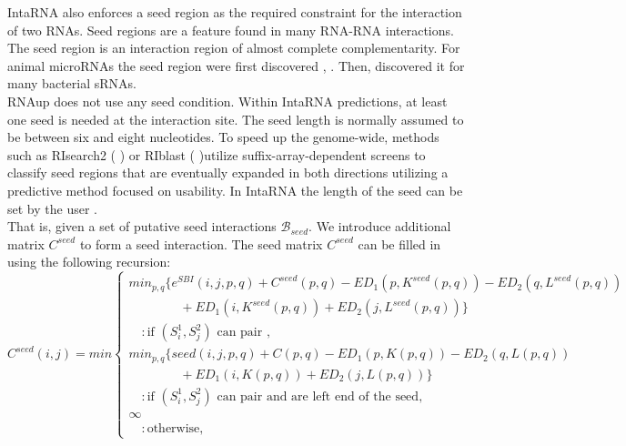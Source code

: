 \documentclass[twoside,a4paper]{report}
\numberwithin{equation}{section}
\begin{document}
	
	IntaRNA also enforces a seed region as the required constraint for the interaction of two RNAs. Seed regions are a feature found in many RNA-RNA interactions. The seed region is an interaction region of almost complete complementarity. For animal microRNAs the seed region were first discovered \citep{bentwich2005prediction}, \citep{brennecke2005principles}. Then, \citet{tjaden2006target} discovered it for many bacterial sRNAs. \\
	
	 RNAup does not use any seed condition. Within IntaRNA predictions, at least one seed is needed at the interaction site. The seed length is normally assumed to be between six and eight nucleotides. To speed up the genome-wide, methods such as RIsearch2 (\citep{alkan2017risearch2} ) or RIblast (\citep{fukunaga2017riblast} )utilize suffix-array-dependent screens to classify seed regions that are eventually expanded in both directions utilizing a predictive method focused on usability. In IntaRNA the length of the seed can be set by the user \citep{busch2008intarna}. \\
	
%	
%	
	
	That is, given a set of putative seed interactions $\mathcal{B}_{seed}$. We introduce additional matrix $C^{seed}$ to form a seed interaction. The seed matrix $C^{seed}$ can be filled in using the following recursion:\\
	
	
		\begin{equation}
	C^{seed}(i,j) =  min \begin{cases}
	min_{p,q}\{ e^{SBI}(i,j,p,q)+ C^{seed}(p,q) - ED_1(p,K^{seed}(p,q)) - ED_2(q,L^{seed}(p,q))\\
	\quad \quad \quad \quad + ED_1(i,K^{seed}(p,q)) + ED_2(j,L^{seed}(p,q))\} \\
	\quad 	: \text{if $(S_i^1 , S_j^2 )$ can pair },\\
	min_{p,q}\{ seed(i,j,p,q)+ C(p,q) - ED_1(p,K(p,q)) - ED_2(q,L(p,q))\\
	\quad \quad \quad \quad + ED_1(i,K(p,q)) + ED_2(j,L(p,q))\} \\
	\quad 	: \text{if $(S_i^1 , S_j^2 )$ can pair and are left end of the seed},\\
	\infty \\
	\quad : \text{otherwise},
	\end{cases}
	\end{equation}
	
\end{document}
